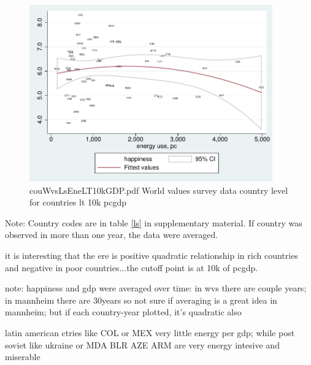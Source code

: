 \documentclass[10pt, letterpaper]{article}
\begin{document}
\begin{spacing}{1.4}
\begin{figure}[H]
 \includegraphics[height=3in]{graphsAndTables/couWvsLsEneLT10kGDP.pdf}\centering
\caption{couWvsLsEneLT10kGDP.pdf World values survey data country level for countries lt 10k pcgdp}\label{couWvsLsEneLT10kGDP.pdf}
\end{figure}
{\scriptsize Note: Country codes are in table \ref{ls} in supplementary
  material. If country was observed in more than one year, the data were averaged.}

it is interesting that the ere is positive quadratic relationship in rich
countries and negative in poor countries...the cutoff point is at 10k of pcgdp.

note: happiness and gdp were averaged over time: in wvs there are couple years;
in mannheim there are 30years so not sure if averaging is a great idea in
mannheim; but if each country-year plotted, it's quadratic also 


latin american ctries like COL or MEX very little energy per gdp; while post
soviet like ukraine or MDA BLR AZE ARM are very energy intesive and miserable



\end{spacing}
\end{document}
